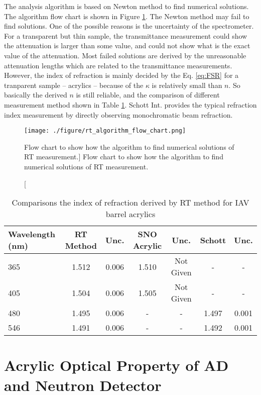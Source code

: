 The analysis algorithm is based on Newton method to find numerical solutions.
The algorithm flow chart is shown in Figure \ref{fig:rt_algorithm_flow_chart.png}.
The Newton method  may fail to find solutions. One of the possible reasons is the uncertainty of the spectrometer.
For a transparent but thin sample, the transmittance measurement could show the attenuation
is larger than some value, and could not show what is the exact value of the attenuation.
Most failed solutions are derived by the unreasonable attenuation lengths which are related to the transmittance measurements.
However, the index of refraction is mainly decided by the Eq. \ref{eq:FSR} for a tranparent sample -- acrylics -- because
of the $\kappa$ is relatively small than $n$. So basically the derived $n$ is still reliable, and the comparison
of different measurement method shown in Table \ref{tab:RTMethodResult}.
Schott Int. provides the typical refraction index measurement by directly observing monochromatic beam refraction.




\begin{figure}
    \centering
    \texttt{[image: ./figure/rt\_algorithm\_flow\_chart.png]}
    \caption
    [Flow chart to show how the algorithm to find numerical solutions of RT measurement.]
    {Flow chart to show how the algorithm to find numerical solutions of RT measurement.}
    \label{fig:rt_algorithm_flow_chart.png}
    \end{figure}


\begin{table}
\centering
\caption{Comparisons the index of refraction derived by RT method for IAV barrel acrylics}
\label{tab:RTMethodResult}
\begin{tabular}{lcccccc}
\hline
Wavelength (nm) & RT Method & Unc. & SNO Acrylic & Unc. & Schott & Unc. \\
\hline
\hline
365 & 1.512 & 0.006 & 1.510 & Not Given & - & - \\
\hline
405 & 1.504 & 0.006 & 1.505 & Not Given & - & - \\
\hline
480 & 1.495 & 0.006 & - & - & 1.497 & 0.001 \\
\hline
546 & 1.491 & 0.006 & - & - & 1.492 & 0.001 \\
\hline
\end{tabular}
\end{table}


\section {Acrylic Optical Property of AD and Neutron Detector}

